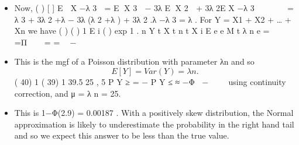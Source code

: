 \documentclass[a4paper,12pt]{article}
\begin{document}
\begin{enumerate}
\begin{itemize}
\item Now, ( ) [ ] E  X −λ 3  = E X 3  − 3λ E X 2  + 3λ 2E X −λ 3      
= λ 3 + 3λ 2 +λ − 3λ (λ 2 +λ ) + 3λ 2 .λ −λ 3 = λ .
For Y = X1 + X2 + … + Xn we have
( ) ( )
1
E i ( ) exp 1 .
n
Y t X t n t
X
i
E e e M t λ n e
=
  =Π   = =  − 
\end{itemize}
\begin{itemize}
\item This is the mgf of a Poisson distribution with parameter λn and so 
\[E[Y] = Var(Y) = λn.\]
( 40) 1 ( 39) 1 39.5 25 ,
5
P Y ≥ = − P Y ≤ ≈ −Φ − 
 
using continuity correction, and μ = λ n = 25. 
\item This is 1−Φ(2.9) = 0.00187 .
With a positively skew distribution, the Normal approximation is likely to
underestimate the probability in the right hand tail and so we expect this answer to be
less than the true value.
\end{itemize}
\end{enumerate}
\end{document}
